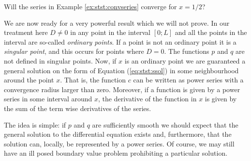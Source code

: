 \bigskip

\begin{question}
	Will the series in Example \ref{ex:stst:convseries} converge for $x=1/2$?
\end{question}

\bigskip


\noindent We are now ready for a very powerful result which we will not prove. In our treatment here 
$D \neq 0$ in any point in the interval $[0; L]$ and all the points in the interval  
are so-called \emph{ordinary points}.  If a point is not an ordinary point it is a 
\emph{singular point}, and this occurs for points where
$D=0$. The functions $p$ and $q$ are not defined in singular points. 
Now, if $x$ is an ordinary point we are guaranteed a general solution on the form
of Equation (\ref{eq:stst:ssol}) in some neighbourhood around the point $x$. That is, the function $c$ 
can be written as power series with a convergence radius larger than zero. Moreover, if a function
is given by a power series in some interval around $x$, the derivative of the function in $x$ 
is given by the sum of the term wise derivatives of the series.  

The idea is simple: if $p$ and $q$ are sufficiently smooth we should expect that the general solution 
to the differential equation exists and, furthermore, that the solution can, locally, be represented by a power series.
Of course, we may still have an ill posed boundary value problem prohibiting a particular solution.

\bigskip 

